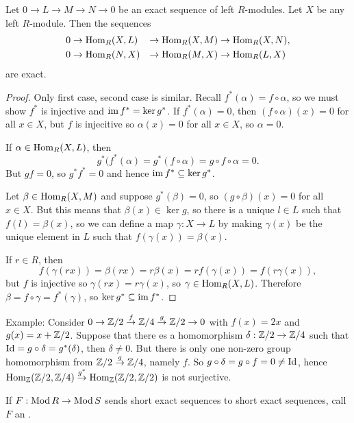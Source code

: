   \begin{lemma}
    Let $0\to L\to M\to N\to 0$ be an exact sequence of left $R$-modules. Let
    $X$ be any left $R$-module. Then the sequences
    \begin{alignat*}{2}
      0&\to \operatorname{Hom}_R(X,L) &\to \operatorname{Hom}_R(X,M) &\to \operatorname{Hom}_R(X,N), \\
      0&\to \operatorname{Hom}_R(N,X) &\to \operatorname{Hom}_R(M,X) &\to \operatorname{Hom}_R(L,X)
    \end{alignat*}
    are exact.
  \end{lemma}
  \begin{proof}
    Only first case, second case is similar. Recall $f^*(\alpha)=f\circ\alpha$,
    so we must show $f^*$ is injective and $\operatorname{im} f^* = \ker g^*$. If
    $f^*(\alpha)=0$, then $(f\circ \alpha)(x) = 0$ for all $x \in X$, but
    $f$ is injecitive so $\alpha(x) = 0$ for all $x\in X$, so $\alpha = 0$.

    If $\alpha \in \operatorname{Hom}_R(X, L)$, then
    \[g^*(f^*(\alpha) = g^*(f\circ \alpha) = g\circ f\circ \alpha = 0.\]
    But $gf = 0$, so $g^*f^* = 0$ and hence $\operatorname{im} f^* \subseteq \ker g^*$.

    Let $\beta \in \operatorname{Hom}_R(X,M)$ and suppose $g^*(\beta) = 0$, so
    $(g\circ\beta)(x) = 0$ for all $x\in X$. But this means that
    $\beta(x) \in \ker g$, so there is a unique $l\in L$ such that
    $f(l) = \beta(x)$, so we can define a map $\gamma:X\to L$ by
    making $\gamma(x)$ be the unique element in $L$ such that
    $f(\gamma(x)) = \beta(x)$.

    If $r\in R$, then
    \[ f(\gamma(rx)) = \beta(rx) = r\beta(x) = r f(\gamma(x)) = f(r\gamma(x)), \]
    but $f$ is injective so $\gamma(rx) = r\gamma(x)$, so
    $\gamma \in \operatorname{Hom}_R(X,L)$. Therefore
    $\beta = f\circ \gamma = f^*(\gamma)$, so $\ker g^* \subseteq \operatorname{im} f^*$.
  \end{proof}

  Example: Consider $0\to \mathbb{Z}/2 \stackrel{f}{\to} \mathbb{Z}/4 \stackrel{g}{\to} \mathbb{Z}/2 \to 0$ with
  $f(x) = 2x$ and $g(x) = x + \mathbb{Z}/2$. Suppose that there es a homomorphism
  $\delta:\mathbb{Z}/2\to \mathbb{Z}/4$ such that $\operatorname{Id} = g\circ \delta = g^*(\delta)$,
  then $\delta \neq 0$. But there is only one non-zero group homomorphism
  from $\mathbb{Z}/2\stackrel{g}{\to} \mathbb{Z}/4$, namely $f$. So $g\circ\delta=g\circ f=0\neq \operatorname{Id}$,
  hence $\operatorname{Hom}_{\mathbb{Z}}(\mathbb{Z}/2,\mathbb{Z}/4)\stackrel{g^*}{\to} \operatorname{Hom}_{\mathbb{Z}}(\mathbb{Z}/2,\mathbb{Z}/2)$ is not
  surjective.

  \begin{define}
    If $F:\operatorname{Mod} R\to \operatorname{Mod} S$ sends short exact sequences to short exact
    sequences, call $F$ an .
  \end{define}

